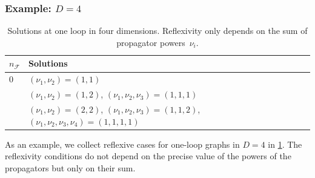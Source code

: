 \documentclass[12pt,a4paper]{article}
\theoremstyle{plain}
\theoremstyle{remark}
\newcommand{\cF}{\mathscr {F}}
\begin{document}
		\subsubsection{Example: $D = 4$}
		\begin{table}[tb]
			\centering
			\setlength{\tabcolsep}{1em}
			\begin{tabular}{ll}
				$n_\cF$ & Solutions   \\
				\midrule
				0 & $(\nu_1,\nu_2 )=(1,1)$  \\
				\addlinespace
				1 & $(\nu_1,\nu_2 )=(1,2)$, $(\nu_1,\nu_2 ,\nu_3)=(1,1,1)$
				\\
				\addlinespace
				2 &$(\nu_1,\nu_2 )=(2,2)$, $(\nu_1,\nu_2 ,\nu_3)=(1,1,2)$,  $(\nu_1,\nu_2,\nu_3,\nu_4 )=(1,1,1,1)$
			\end{tabular}
			\caption{Solutions at one loop in four dimensions. Reflexivity only depends on the sum of propagator powers~$\nu_i$.}
			\label{tab:1loop}
		\end{table} 
As an example, we collect reflexive cases for one-loop graphs in $D=4$ in \cref{tab:1loop}. 		The reflexivity conditions do not depend on the precise value of the powers of the propagators but only on their sum.
		
\end{document}
